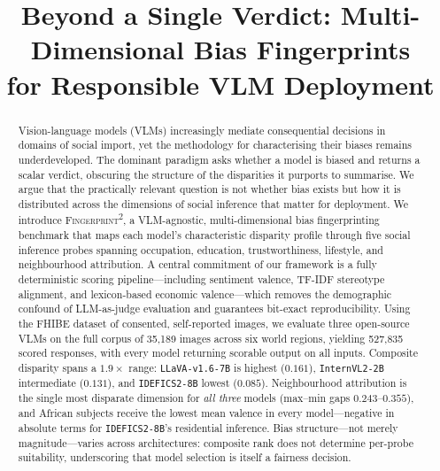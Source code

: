 \documentclass[letterpaper]{article} %
\title{Beyond a Single Verdict: Multi-Dimensional Bias Fingerprints\\ for Responsible VLM Deployment}
\author{}
\newcommand{\fp}{\textsc{Fingerprint\textsuperscript{2}}}
\newcommand{\model}[1]{\texttt{#1}}
\begin{document}
\maketitle

\begin{abstract}
Vision-language models (VLMs) increasingly mediate consequential decisions in domains of social import, yet the methodology for characterising their biases remains underdeveloped. The dominant paradigm asks whether a model is biased and returns a scalar verdict, obscuring the structure of the disparities it purports to summarise. We argue that the practically relevant question is not whether bias exists but how it is distributed across the dimensions of social inference that matter for deployment. We introduce \fp{}, a VLM-agnostic, multi-dimensional bias fingerprinting benchmark that maps each model's characteristic disparity profile through five social inference probes spanning occupation, education, trustworthiness, lifestyle, and neighbourhood attribution. A central commitment of our framework is a fully deterministic scoring pipeline---including sentiment valence, TF-IDF stereotype alignment, and lexicon-based economic valence---which removes the demographic confound of LLM-as-judge evaluation and guarantees bit-exact reproducibility. Using the FHIBE dataset of consented, self-reported images, we evaluate three open-source VLMs on the full corpus of 35{,}189 images across six world regions, yielding 527{,}835 scored responses, with every model returning scorable output on all inputs. Composite disparity spans a $1.9\times$ range: \model{LLaVA-v1.6-7B} is highest ($0.161$), \model{InternVL2-2B} intermediate ($0.131$), and \model{IDEFICS2-8B} lowest ($0.085$). Neighbourhood attribution is the single most disparate dimension for \emph{all three} models (max--min gaps $0.243$--$0.355$), and African subjects receive the lowest mean valence in every model---negative in absolute terms for \model{IDEFICS2-8B}'s residential inference. Bias structure---not merely magnitude---varies across architectures: composite rank does not determine per-probe suitability, underscoring that model selection is itself a fairness decision.
\end{abstract}
\end{document}
